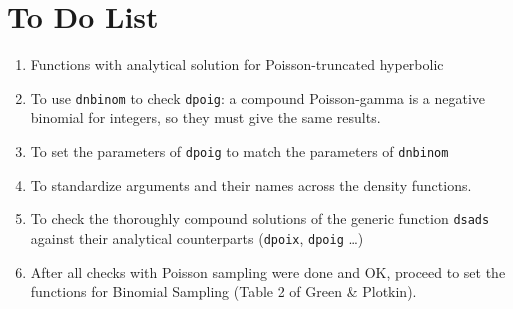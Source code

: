 \documentclass{article}
\newcommand{\code}[1]{\texttt{#1}}
\begin{document}
\section*{To Do List}

\begin{enumerate}
\item Functions with analytical solution for Poisson-truncated hyperbolic
\item To use \code{dnbinom} to check \code{dpoig}: a compound Poisson-gamma is a negative binomial for integers, so they must give the same results. 
\item To set the parameters of \code{dpoig} to match the parameters of \code{dnbinom}
\item To standardize arguments and their names across the density functions. 
\item To check the thoroughly compound solutions of the generic function \code{dsads} against their analytical counterparts (\code{dpoix}, \code{dpoig} \ldots)  
\item After all checks with Poisson sampling were done and OK, proceed to set the functions for Binomial Sampling (Table 2 of Green \& Plotkin).
\end{enumerate}
\end{document}
